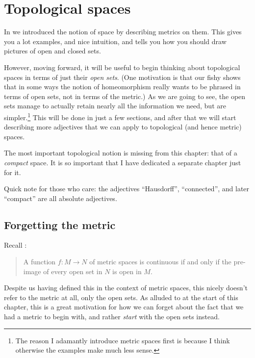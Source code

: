 \chapter{Topological spaces}
\label{ch:top_more}

In  we introduced the notion
of space by describing metrics on them.
This gives you a lot examples, and nice intuition,
and tells you how you should draw pictures of open and closed sets.

However, moving forward, it will be useful to begin
thinking about topological spaces in terms of just their \emph{open sets}.
(One motivation is that our fishy  shows that
in some ways the notion of homeomorphism really wants
to be phrased in terms of open sets, not in terms of the metric.)
As we are going to see, the open sets manage to actually retain
nearly all the information we need, but are simpler.\footnote{The
	reason I adamantly introduce metric spaces first
	is because I think otherwise the examples make much less sense.}
This will be done in just a few sections,
and after that we will start describing more adjectives
that we can apply to topological (and hence metric) spaces.

The most important topological notion is missing from this chapter:
that of a \emph{compact} space.
It is so important that I have dedicated a separate chapter just for it.

Quick note for those who care:
the adjectives ``Hausdorff'', ``connected'',
and later ``compact'' are all absolute adjectives.



\section{Forgetting the metric}
Recall :
\begin{quote}
	A function $f \colon M \to N$ of metric spaces is continuous
	if and only if the pre-image of every open set in $N$ is open in $M$.
\end{quote}
Despite us having defined this in the context of metric spaces,
this nicely doesn't refer to the metric at all,
only the open sets.
As alluded to at the start of this chapter,
this is a great motivation for how we can forget
about the fact that we had a metric to begin with,
and rather \emph{start} with the open sets instead.

